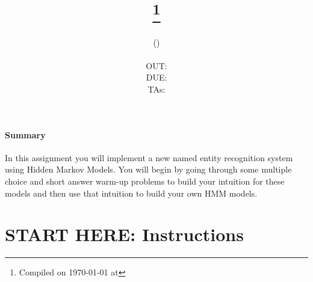 \documentclass[11pt,addpoints,answers]{exam}
\title{\textsc{\hwNum}\\
\textsc{\hwTopic}
\thanks{Compiled on \today{} at \currenttime{}}\\
\vspace{1em}
} %
\author{\textsc{\large \courseNum{} \courseName{} (\courseSem)}\\
\courseUrl
\vspace{1em}\\
  OUT: \outDate \\
  DUE: \dueDate \\
  TAs: \taNames\\
}
\date{}
\date{}
\begin{document}
\maketitle

\begin{notebox}
\paragraph{Summary} In this assignment you will implement a new named entity recognition system using Hidden Markov Models. You will begin by going through some multiple choice and short answer warm-up problems to build your intuition for these models and then use that intuition to build your own HMM models.
\end{notebox}\newcommand \maxsubs {10 }
\section*{START HERE: Instructions}
\end{document}
